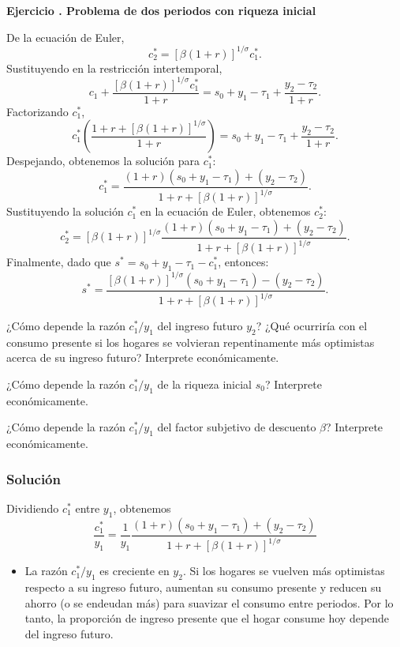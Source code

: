 \documentclass[11pt]{article}
\let\enumerateoriginal\enumerate
\let\endenumerateoriginal\endenumerate
\renewenvironment{enumerate}{%
  \enumerateoriginal
  \setlength{\itemsep}{0.5em}%
  \setlength{\parsep}{0pt}%
  \setlength{\topsep}{0.4em}%
}{\endenumerateoriginal}
\newcounter{problema}
\newenvironment{problema}[1]{%
  \par
  \refstepcounter{problema}%
  \addvspace{0.9em}%
  \noindent\textbf{Ejercicio \theproblema. #1}
  \par\nobreak\smallskip
}{\par}
\begin{document}
\begin{problema}{Problema de dos periodos con riqueza inicial}
\begin{enumerate}
De la ecuación de Euler,
\[
  c_2^*
  =
  \left[\beta(1+r)\right]^{1/\sigma}c_1^*.
\]
Sustituyendo en la restricción intertemporal,
\[
  c_1+\frac{\left[\beta(1+r)\right]^{1/\sigma}c_1^*}{1+r} = s_0+y_1-\tau_1+\frac{y_2-\tau_2}{1+r}.
\]
Factorizando $c_1^*$,
\[
  c_1^*\left(\frac{1 + r + \left[\beta(1 + r)\right]^{1/\sigma}}{1 + r}\right) = s_0+y_1-\tau_1+\frac{y_2-\tau_2}{1+r}.
\]
Despejando, obtenemos la solución para $c_1^*$:
\[
  \boxed{
  c_1^*
  =
  \frac{(1+r)(s_0+y_1-\tau_1)+(y_2-\tau_2)}
       {1+r+\left[\beta(1+r)\right]^{1/\sigma}}
  }.
\]
Sustituyendo la solución $c_1^*$ en la ecuación de Euler, obtenemos $c_2^*$:
\[
  \boxed{
  c_2^*
  =
  \left[\beta(1+r)\right]^{1/\sigma}
  \frac{(1+r)(s_0+y_1-\tau_1)+(y_2-\tau_2)}
       {1+r+\left[\beta(1+r)\right]^{1/\sigma}}
  }.
\]
Finalmente, dado que $s^* = s_0+y_1-\tau_1 - c_1^*$, entonces:
\[
  \boxed{
  s^*
  =
  \frac{
  \left[\beta(1+r)\right]^{1/\sigma}
  (s_0+y_1-\tau_1)-(y_2-\tau_2)}
  {1+r+\left[\beta(1+r)\right]^{1/\sigma}}
  }.
\]

    \item ¿Cómo depende la razón $c_1^*/y_1$ del ingreso futuro $y_2$? ¿Qué ocurriría con el consumo presente si los hogares se volvieran repentinamente más optimistas acerca de su ingreso futuro? Interprete económicamente.

    \item ¿Cómo depende la razón $c_1^*/y_1$ de la riqueza inicial $s_0$? Interprete económicamente.

    \item ¿Cómo depende la razón $c_1^*/y_1$ del factor subjetivo de descuento $\beta$? Interprete económicamente.
    
    \subsubsection*{Solución}
    Dividiendo \(c_1^*\) entre \(y_1\), obtenemos
      \[
      \frac{c_1^*}{y_1}
      =
      \frac{1}{y_1}
      \frac{(1+r)(s_0+y_1-\tau_1)+(y_2-\tau_2)}
      {1+r+\left[\beta(1+r)\right]^{1/\sigma}}
      \]
    \begin{itemize}
      \item La razón \(c_1^*/y_1\) es creciente en \(y_2\). Si los hogares se vuelven más optimistas respecto a su ingreso futuro, aumentan su consumo presente y reducen su ahorro (o se endeudan más) para suavizar el consumo entre periodos. Por lo tanto, la proporción de ingreso presente que el hogar consume hoy depende del ingreso futuro.


\end{itemize}
\end{enumerate}
\end{problema}
\end{document}
